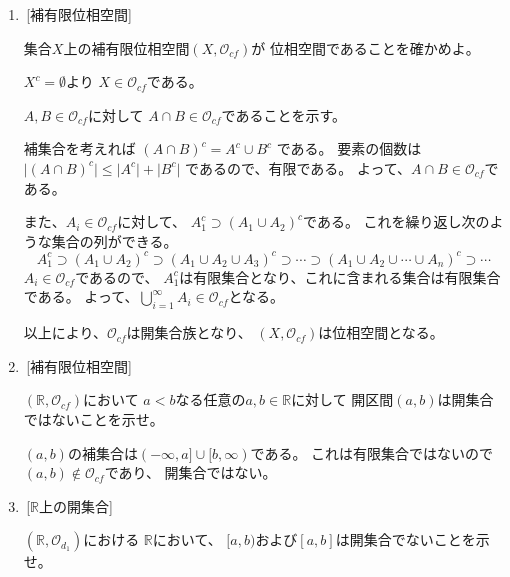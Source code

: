 \documentclass[12pt,b5paper]{ltjsarticle}
\begin{document}
\begin{enumerate}
 \item
      \,[補有限位相空間]

      集合$X$上の補有限位相空間$(X,\mathcal{O}_{cf})$が
      位相空間であることを確かめよ。

\dotfill

      $X^c=\emptyset$より
      $X\in\mathcal{O}_{cf}$である。

      $A,B\in\mathcal{O}_{cf}$に対して
      $A\cap B\in\mathcal{O}_{cf}$であることを示す。

      補集合を考えれば
      $(A\cap B)^c=A^c \cup B^c$
      である。
      要素の個数は
      $\lvert (A\cap B)^c \rvert
      \leq \lvert A^c \rvert + \lvert B^c \rvert$
      であるので、有限である。
      よって、$A\cap B\in\mathcal{O}_{cf}$である。

      また、$A_{i}\in\mathcal{O}_{cf}$に対して、
      $A_1^c \supset (A_1 \cup A_2)^c$である。
      これを繰り返し次のような集合の列ができる。
      \begin{equation}
       A_1^c \supset (A_1 \cup A_2)^c \supset (A_1 \cup A_2 \cup A_3)^c \supset \cdots \supset (A_1 \cup A_2 \cup \cdots \cup A_n)^c \supset \cdots
      \end{equation}
      $A_{i}\in\mathcal{O}_{cf}$であるので、
      $A_1^c$は有限集合となり、これに含まれる集合は有限集合である。
      よって、$\bigcup_{i=1}^{\infty}A_{i}\in\mathcal{O}_{cf}$となる。

      以上により、$\mathcal{O}_{cf}$は開集合族となり、
      $(X,\mathcal{O}_{cf})$は位相空間となる。

\hrulefill
 \item
      \,[補有限位相空間]

      $(\mathbb{R},\mathcal{O}_{cf})$において
      $a<b$なる任意の$a,b\in\mathbb{R}$に対して
      開区間$(a,b)$は開集合ではないことを示せ。

\dotfill

      $(a,b)$の補集合は$(-\infty,a]\cup [b,\infty)$である。
      これは有限集合ではないので
      $(a,b)\not\in\mathcal{O}_{cf}$であり、
      開集合ではない。
      
      

\hrulefill

 \item
      \,[$\mathbb{R}$上の開集合]

      $(\mathbb{R},\mathcal{O}_{d_1})$における
      $\mathbb{R}$において、
      $[a,b)$および$[a,b]$は開集合でないことを示せ。


\end{enumerate}
\end{document}
